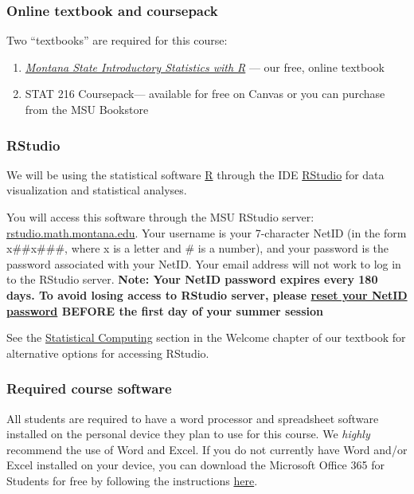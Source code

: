 \documentclass[
]{article}
\providecommand{\tightlist}{%
  \setlength{\itemsep}{0pt}\setlength{\parskip}{0pt}}
\begin{document}
\subsubsection{Online textbook and
coursepack}\label{online-textbook-and-coursepack}

Two ``textbooks'' are required for this course:

\begin{enumerate}
\def\labelenumi{\arabic{enumi}.}
\tightlist
\item
  \href{https://mtstateintrostats.github.io/IntroStatTextbook/}{\emph{Montana
  State Introductory Statistics with R}} --- our free, online textbook
\item
  STAT 216 Coursepack--- available for free on Canvas or you can
  purchase from the MSU Bookstore
\end{enumerate}

\subsubsection{RStudio}\label{rstudio}

We will be using the statistical software
\href{https://www.r-project.org/}{R} through the IDE
\href{https://rstudio.com/products/rstudio/}{RStudio} for data
visualization and statistical analyses.

You will access this software through the MSU RStudio server:
\href{https://rstudio.math.montana.edu/}{rstudio.math.montana.edu}. Your
username is your 7-character NetID (in the form x\#\#x\#\#\#, where x is
a letter and \# is a number), and your password is the password
associated with your NetID. Your email address will not work to log in
to the RStudio server. \textbf{Note: Your NetID password expires every
180 days. To avoid losing access to RStudio server, please
\href{https://pwreset.montana.edu/react/}{reset your NetID password}
BEFORE the first day of your summer session}

See the
\href{https://mtstateintrostats.github.io/IntroStatTextbook/\#stat-computing}{Statistical
Computing} section in the Welcome chapter of our textbook for
alternative options for accessing RStudio.

\subsubsection{Required course software}\label{required-course-software}

All students are required to have a word processor and spreadsheet
software installed on the personal device they plan to use for this
course. We \emph{highly} recommend the use of Word and Excel. If you do
not currently have Word and/or Excel installed on your device, you can
download the Microsoft Office 365 for Students for free by following the
instructions
\href{https://coe.montana.edu/it/students/student-software.html}{here}.
\end{document}
